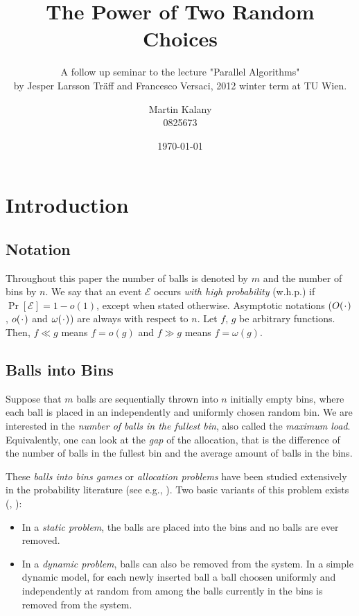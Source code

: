 \documentclass{acm_proc_article-sp}
\newcommand*{\PH}{\makebox[1ex]{\textbf{$\cdot$}}}
\begin{document}
\title{The Power of Two Random Choices}
\subtitle{\large A follow up seminar to the lecture "Parallel Algorithms"\\ by Jesper Larsson Tr\"aff and Francesco Versaci, 2012 winter term at TU Wien.}

\author{
\alignauthor
Martin Kalany\\
       0825673
}    
\date{\today}

\maketitle
\begin{abstract}

\end{abstract}


\section{Introduction}
\label{sec:intro}

\subsection{Notation}
\label{sec:notation}
Throughout this paper the number of balls is denoted by $m$ and the number of bins by $n$. We say that an event $\mathcal E$ occurs \emph{with high probability} (w.h.p.) if $\Pr\left[\mathcal E \right] = 1 - o(1)$, except when stated otherwise. Asymptotic notations ($O(\PH)$, $o(\PH)$ and $\omega(\PH)$) are always with respect to $n$. Let $f$, $g$ be arbitrary functions. Then, $f \ll g$ means $f = o(g)$ and $ f \gg g$ means $f = \omega(g)$.

\subsection{Balls into Bins}
\label{sec:ballsIntoBins}
Suppose that $m$ balls are sequentially thrown into $n$ initially empty bins, where each ball is placed in an independently and uniformly chosen random bin. We are interested in the \emph{number of balls in the fullest bin}, also called the \emph{maximum load}. Equivalently, one can look at the \emph{gap} of the allocation, that is the difference of the number of balls in the fullest bin and the average amount of balls in the bins. 

These \emph{balls into bins games} or \emph{allocation problems} have been studied extensively in the probability literature (see e.g., \cite{JK77}). Two basic variants of this problem exists (\cite{ABKU99}, \cite{RMS01}):
\begin{itemize}
\item In a \emph{static problem}, the balls are placed into the bins and no balls are ever removed.
\item In a \emph{dynamic problem}, balls can also be removed from the system. In a simple dynamic model, for each newly inserted ball a ball choosen uniformly and independently at random from among the balls currently in the bins is removed from the system.
\end{itemize}
\end{document}
